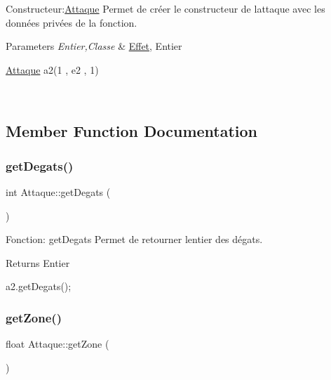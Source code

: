 Constructeur\+:\hyperlink{classAttaque}{Attaque} Permet de créer le constructeur de l\textquotesingle{}attaque avec les données privées de la fonction. 


\begin{DoxyParams}{Parameters}
{\em Entier,Classe} & \hyperlink{classEffet}{Effet}, Entier 
\begin{DoxyCode}
\hyperlink{classAttaque}{Attaque} a2(1 , e2 , 1)
\end{DoxyCode}
 \\
\hline
\end{DoxyParams}


\subsection{Member Function Documentation}
\mbox{\label{classAttaque_a56856e2880988e4cf9b051d32ca427a3}} 
\subsubsection{\texorpdfstring{get\+Degats()}{getDegats()}}
{\footnotesize\ttfamily int Attaque\+::get\+Degats (\begin{DoxyParamCaption}{ }\end{DoxyParamCaption})}



Fonction\+: get\+Degats Permet de retourner l\textquotesingle{}entier des dégats. 

\begin{DoxyReturn}{Returns}
Entier 
\begin{DoxyCode}
a2.getDegats();
\end{DoxyCode}
 
\end{DoxyReturn}
\mbox{\label{classAttaque_a84b1813598ac33dfcb76652d7ad4ebd4}} 
\subsubsection{\texorpdfstring{get\+Zone()}{getZone()}}
{\footnotesize\ttfamily float Attaque\+::get\+Zone (\begin{DoxyParamCaption}{ }\end{DoxyParamCaption})}



